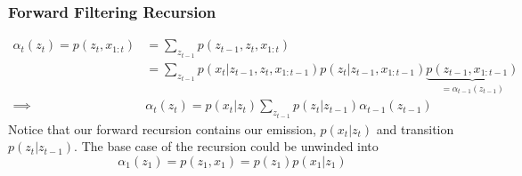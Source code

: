 \documentclass[11pt]{article}
\newcommand{\bx}{\mathbf{x}}
\begin{document}
\subsubsection{Forward Filtering Recursion}
\begin{align*}
    \alpha_t(z_t) = p\left(z_{t}, x_{1: t}\right)
    &=\sum_{z_{t-1}} p\left(z_{t-1}, z_{t}, x_{1: t}\right) \\
    &= \sum_{z_{t-1}} p\left(x_{t} | z_{t-1}, z_{t}, x_{1: t-1}\right) p\left(z_{t} | z_{t-1}, x_{1: t-1}\right) \underbrace{p\left(z_{t-1}, x_{1: t-1}\right)}_{ = \alpha_{t - 1}(z_{t - 1})}\\
    \implies &\alpha_{t}\left(z_{t}\right)=p\left(x_{t} | z_{t}\right) \sum_{z_{t-1}} p\left(z_{t} | z_{t-1}\right) \alpha_{t-1}\left(z_{t-1}\right)
\end{align*}
Notice that our forward recursion contains our emission, $p(x_t | z_t)$ and transition $p(z_t | z_{t - 1})$. The base case of the recursion could be unwinded into
\begin{equation*}
    \alpha_{1}\left(z_{1}\right)=p\left(z_{1}, x_{1}\right)=p\left(z_{1}\right) p\left(x_{1} | z_{1}\right)
\end{equation*}
\end{document}
